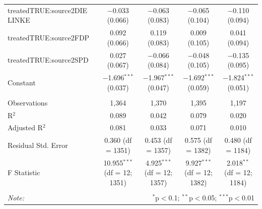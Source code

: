 \documentclass[
]{article}
\begin{document}
\begin{table}[!htbp]
\begin{tabular}{@{\extracolsep{5pt}}lcccc}
  treatedTRUE:source2DIE LINKE & $-$0.033 (0.066) & $-$0.063 (0.083) & $-$0.065 (0.104) & $-$0.110 (0.094) \\ 
  treatedTRUE:source2FDP & 0.092 (0.066) & 0.119 (0.083) & 0.009 (0.105) & 0.041 (0.094) \\ 
  treatedTRUE:source2SPD & 0.027 (0.067) & $-$0.066 (0.084) & $-$0.048 (0.105) & $-$0.135 (0.095) \\ 
  Constant & $-$1.696$^{***}$ (0.037) & $-$1.967$^{***}$ (0.047) & $-$1.692$^{***}$ (0.059) & $-$1.824$^{***}$ (0.051) \\ 
 \hline \\[-1.8ex] 
Observations & 1,364 & 1,370 & 1,395 & 1,197 \\ 
R$^{2}$ & 0.089 & 0.042 & 0.079 & 0.020 \\ 
Adjusted R$^{2}$ & 0.081 & 0.033 & 0.071 & 0.010 \\ 
Residual Std. Error & 0.360 (df = 1351) & 0.453 (df = 1357) & 0.575 (df = 1382) & 0.480 (df = 1184) \\ 
F Statistic & 10.955$^{***}$ (df = 12; 1351) & 4.925$^{***}$ (df = 12; 1357) & 9.927$^{***}$ (df = 12; 1382) & 2.018$^{**}$ (df = 12; 1184) \\ 
\hline 
\hline \\[-1.8ex] 
\textit{Note:}  & \multicolumn{4}{r}{$^{*}$p$<$0.1; $^{**}$p$<$0.05; $^{***}$p$<$0.01} \\ 
\end{tabular} 
\end{table}
\end{document}
